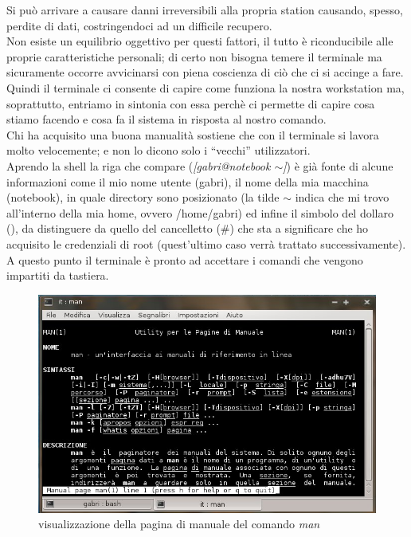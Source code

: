 Si può arrivare a causare danni irreversibili alla propria station causando, spesso, perdite di dati, costringendoci ad un difficile recupero.\\

Non esiste un equilibrio oggettivo per questi fattori, il tutto è riconducibile alle proprie caratteristiche personali; di certo non bisogna temere il terminale ma sicuramente occorre avvicinarsi con piena coscienza di ciò che ci si accinge a fare.\\

Quindi il terminale ci consente di capire come funziona la nostra workstation ma, soprattutto, entriamo in sintonia con essa perchè ci permette di capire cosa stiamo facendo e cosa fa il sistema in risposta al nostro comando.\\

Chi ha acquisito una buona manualità sostiene che con il terminale si lavora molto velocemente; e non lo dicono solo i ``vecchi'' utilizzatori.\\

Aprendo la shell la riga che compare ({\itshape [gabri@notebook $\sim$]\textdollar}) è già fonte di alcune informazioni come il mio nome utente (gabri), il nome della mia macchina (notebook), in quale directory sono posizionato (la tilde $\sim$ indica che mi trovo all'interno della mia home, ovvero /home/gabri) ed infine il simbolo del dollaro (\textdollar), da distinguere da quello del cancelletto (\#) che sta a significare che ho acquisito le credenziali di root (quest'ultimo caso verrà trattato successivamente).\\

A questo punto il terminale è pronto ad accettare i comandi che vengono impartiti da tastiera.

\begin{figure}[!t]
\centering
\includegraphics[scale=.80]{articoli/primi_passi/immagini/man_man.jpeg}
\caption{visualizzazione della pagina di manuale del comando {\itshape man}\label{Fig.4: man_man}}
\end{figure}

